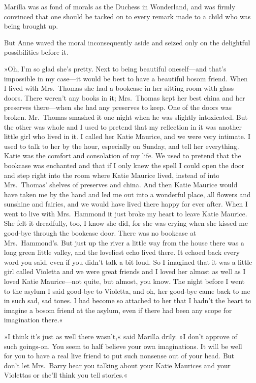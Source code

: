 Marilla was as fond of morals as the Duchess in Wonderland, and was firmly convinced that one should be tacked on to every remark made to a child who was being brought up.

But Anne waved the moral inconsequently aside and seized only on the delightful possibilities before it.

»Oh, I'm so glad she's pretty. Next to being beautiful oneself—and that's impossible in my case—it would be best to have a beautiful bosom friend. When I lived with Mrs.~Thomas she had a bookcase in her sitting room with glass doors. There weren't any books in it; Mrs.~Thomas kept her best china and her preserves there—when she had any preserves to keep. One of the doors was broken. Mr.~Thomas smashed it one night when he was slightly intoxicated. But the other was whole and I used to pretend that my reflection in it was another little girl who lived in it. I called her Katie Maurice, and we were very intimate. I used to talk to her by the hour, especially on Sunday, and tell her everything. Katie was the comfort and consolation of my life. We used to pretend that the bookcase was enchanted and that if I only knew the spell I could open the door and step right into the room where Katie Maurice lived, instead of into Mrs.~Thomas' shelves of preserves and china. And then Katie Maurice would have taken me by the hand and led me out into a wonderful place, all flowers and sunshine and fairies, and we would have lived there happy for ever after. When I went to live with Mrs.~Hammond it just broke my heart to leave Katie Maurice. She felt it dreadfully, too, I know she did, for she was crying when she kissed me good-bye through the bookcase door. There was no bookcase at Mrs.~Hammond's. But just up the river a little way from the house there was a long green little valley, and the loveliest echo lived there. It echoed back every word you said, even if you didn't talk a bit loud. So I imagined that it was a little girl called Violetta and we were great friends and I loved her almost as well as I loved Katie Maurice—not quite, but almost, you know. The night before I went to the asylum I said good-bye to Violetta, and oh, her good-bye came back to me in such sad, sad tones. I had become so attached to her that I hadn't the heart to imagine a bosom friend at the asylum, even if there had been any scope for imagination there.«

»I think it's just as well there wasn't,« said Marilla drily. »I don't approve of such goings-on. You seem to half believe your own imaginations. It will be well for you to have a real live friend to put such nonsense out of your head. But don't let Mrs.~Barry hear you talking about your Katie Maurices and your Violettas or she'll think you tell stories.«

